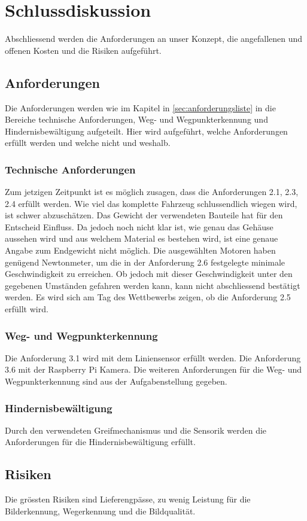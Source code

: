 \documentclass[../main.tex]{subfiles}
\begin{document}
\newpage
\section{Schlussdiskussion}

Abschliessend werden die Anforderungen an unser Konzept, die angefallenen und offenen Kosten und die Risiken aufgeführt. 
\subsection{Anforderungen}
Die Anforderungen werden wie im Kapitel in \ref{sec:anforderungsliste} in die Bereiche technische Anforderungen, Weg- und Wegpunkterkennung und Hindernisbewältigung aufgeteilt. Hier wird aufgeführt, welche Anforderungen erfüllt werden und welche nicht und weshalb.
\subsubsection{Technische Anforderungen}
Zum jetzigen Zeitpunkt ist es möglich zusagen, dass die Anforderungen 2.1, 2.3, 2.4 erfüllt werden. Wie viel das komplette Fahrzeug schlussendlich wiegen wird, ist schwer abzuschätzen. Das Gewicht der verwendeten Bauteile hat für den Entscheid Einfluss. Da jedoch noch nicht klar ist, wie genau das Gehäuse aussehen wird und aus welchem Material es bestehen wird, ist eine genaue Angabe zum Endgewicht nicht möglich. Die ausgewählten Motoren haben genügend Newtonmeter, um die in der Anforderung 2.6 festgelegte minimale Geschwindigkeit zu erreichen. Ob jedoch mit dieser Geschwindigkeit unter den gegebenen Umständen gefahren werden kann, kann nicht abschliessend bestätigt werden.
Es wird sich am Tag des Wettbewerbs zeigen, ob die Anforderung 2.5 erfüllt wird.
\subsubsection{Weg- und Wegpunkterkennung}
Die Anforderung 3.1 wird mit dem Liniensensor erfüllt werden. Die Anforderung 3.6 mit der Raspberry Pi Kamera. Die weiteren Anforderungen für die Weg- und Wegpunkterkennung sind aus der Aufgabenstellung gegeben. 
\subsubsection{Hindernisbewältigung}
Durch den verwendeten Greifmechanismus und die Sensorik werden die Anforderungen für die Hindernisbewältigung erfüllt.
\newpage
\subsection{Risiken}
Die grössten Risiken sind Lieferengpässe, zu wenig Leistung für die Bilderkennung, Wegerkennung und die Bildqualität. 
\end{document}
